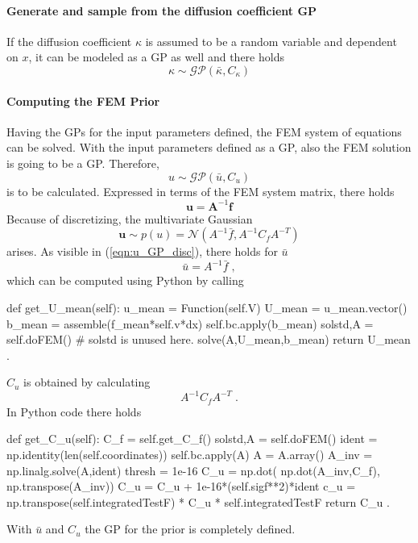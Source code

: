 \documentclass[%
  a4paper,oneside,%
  11pt,%
  smallchapters,
  green,%
  rgb, <cmyk>
  ]{tubsbook}
\begin{document}
\paragraph{Generate and sample from the diffusion coefficient GP}
If the diffusion coefficient $\kappa$ is assumed to be a random variable and dependent on $x$, it can be modeled as a GP as well and there holds
\begin{equation}
\kappa \sim \mathcal{GP}(\bar{\kappa},C_{\kappa})
\end{equation}

\paragraph{Computing the FEM Prior}
Having the GPs for the input parameters defined, the FEM system of equations can be solved. With the input parameters defined as a GP, also the FEM solution is going to be a GP. Therefore, 
\begin{equation}
u \sim \mathcal{GP}(\bar{u}, C_u)
\end{equation}
is to be calculated. Expressed in terms of the FEM system matrix, there holds
\begin{equation}
\bm{u} = \bm{A}^{-1}\bm{f}
\end{equation}
Because of discretizing, the multivariate Gaussian
\begin{equation}
\bm{u} \sim p(u) = \mathcal{N} \left( A^{-1} \bar{f}, A^{-1} C_f A^{-T}  \right)
\label{eqn:u_GP_disc}
\end{equation}
arises.
As visible in (\ref{eqn:u_GP_disc}), there holds for $\bar{u}$
\begin{equation}
\bar{u} = A^{-1} \bar{f} \; ,
\end{equation}
which can be computed using Python by calling
\begin{python}
def get_U_mean(self):
	u_mean = Function(self.V)
	U_mean = u_mean.vector()
	b_mean = assemble(f_mean*self.v*dx) 
	self.bc.apply(b_mean)
	solstd,A = self.doFEM()  # solstd is unused here.
	solve(A,U_mean,b_mean)
	return U_mean .
\end{python}
\label{lst:get_u_mean}
$C_u$ is obtained by calculating
\begin{equation}
A^{-1} C_f A^{-T} \; .
\end{equation}
In Python code there holds
\begin{python}
def get_C_u(self):
	C_f = self.get_C_f()
	solstd,A = self.doFEM()
	ident = np.identity(len(self.coordinates))
	self.bc.apply(A)
	A = A.array()
	A_inv = np.linalg.solve(A,ident)
	thresh = 1e-16
	C_u = np.dot( np.dot(A_inv,C_f), np.transpose(A_inv))
	C_u = C_u + 1e-16*(self.sigf**2)*ident
	c_u = np.transpose(self.integratedTestF) * C_u * self.integratedTestF
	return C_u .
\end{python}
\label{lst:get_C_u}
With $\bar{u}$ and $C_u$ the GP for the prior is completely defined. 
\end{document}
